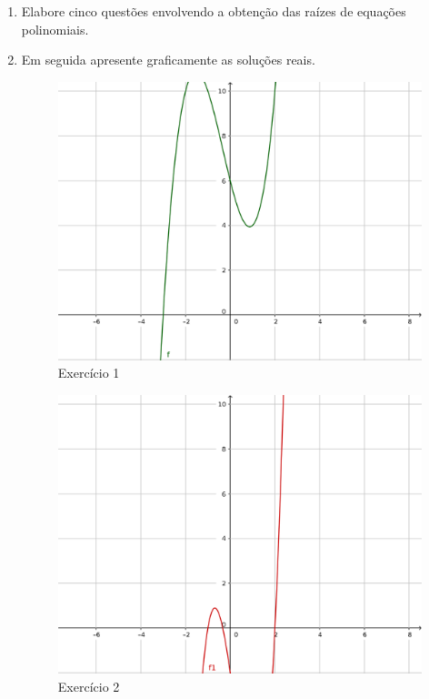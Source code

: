 \documentclass[a4paper, 12pt]{article}
\begin{document}
\begin{enumerate}
\item Elabore cinco questões envolvendo a obtenção das raízes de equações polinomiais.\\
  \begin{enumerate}
  \end{enumerate}
\item Em seguida apresente graficamente as soluções reais. \\
    \begin{figure}[h!]
    \centering
    \includegraphics[width=120mm]{img1.png}
    \caption{Exercício 1}
    \end{figure}

    \begin{figure}[h!]
    \centering
    \includegraphics[width=120mm]{img2.png}
    \caption{Exercício 2}
    \end{figure}


\end{enumerate}
\end{document}
